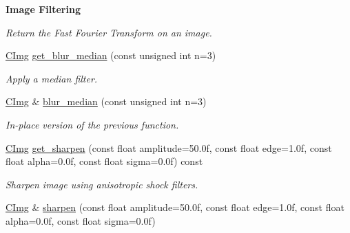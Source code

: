 \begin{Indent}{\bf Image Filtering}
\begin{DoxyCompactItemize}
\begin{DoxyCompactList}\small\item\em Return the Fast Fourier Transform on an image. \end{DoxyCompactList}\item 
\hypertarget{structcimg__library_1_1_c_img_a9f31f9c2980b27d89c5df322807a7a3e}{\hyperlink{structcimg__library_1_1_c_img}{C\-Img} \hyperlink{structcimg__library_1_1_c_img_a9f31f9c2980b27d89c5df322807a7a3e}{get\-\_\-blur\-\_\-median} (const unsigned int n=3)}\label{structcimg__library_1_1_c_img_a9f31f9c2980b27d89c5df322807a7a3e}

\begin{DoxyCompactList}\small\item\em Apply a median filter. \end{DoxyCompactList}\item 
\hypertarget{structcimg__library_1_1_c_img_aec66b5c98d17186d69b1042d5925a45a}{\hyperlink{structcimg__library_1_1_c_img}{C\-Img} \& \hyperlink{structcimg__library_1_1_c_img_aec66b5c98d17186d69b1042d5925a45a}{blur\-\_\-median} (const unsigned int n=3)}\label{structcimg__library_1_1_c_img_aec66b5c98d17186d69b1042d5925a45a}

\begin{DoxyCompactList}\small\item\em In-\/place version of the previous function. \end{DoxyCompactList}\item 
\hypertarget{structcimg__library_1_1_c_img_ad55e9b1d363edbf22626437d9d8f6733}{\hyperlink{structcimg__library_1_1_c_img}{C\-Img} \hyperlink{structcimg__library_1_1_c_img_ad55e9b1d363edbf22626437d9d8f6733}{get\-\_\-sharpen} (const float amplitude=50.\-0f, const float edge=1.\-0f, const float alpha=0.\-0f, const float sigma=0.\-0f) const }\label{structcimg__library_1_1_c_img_ad55e9b1d363edbf22626437d9d8f6733}

\begin{DoxyCompactList}\small\item\em Sharpen image using anisotropic shock filters. \end{DoxyCompactList}\item 
\hypertarget{structcimg__library_1_1_c_img_a082215bbfbfef39b22ec607df8e0f482}{\hyperlink{structcimg__library_1_1_c_img}{C\-Img} \& \hyperlink{structcimg__library_1_1_c_img_a082215bbfbfef39b22ec607df8e0f482}{sharpen} (const float amplitude=50.\-0f, const float edge=1.\-0f, const float alpha=0.\-0f, const float sigma=0.\-0f)}\label{structcimg__library_1_1_c_img_a082215bbfbfef39b22ec607df8e0f482}


\end{DoxyCompactItemize}
\end{Indent}
